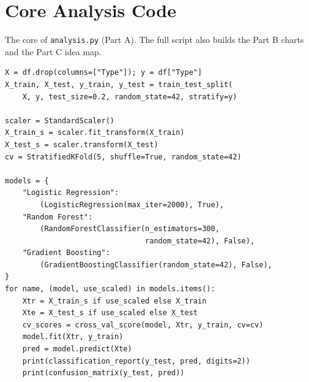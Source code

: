 \documentclass[conference]{IEEEtran}
\begin{document}
\appendix
\section{Core Analysis Code}
The core of \texttt{analysis.py} (Part A). The full script also builds the Part B charts and the Part C idea map.
\begin{verbatim}
X = df.drop(columns=["Type"]); y = df["Type"]
X_train, X_test, y_train, y_test = train_test_split(
    X, y, test_size=0.2, random_state=42, stratify=y)

scaler = StandardScaler()
X_train_s = scaler.fit_transform(X_train)
X_test_s = scaler.transform(X_test)
cv = StratifiedKFold(5, shuffle=True, random_state=42)

models = {
    "Logistic Regression":
        (LogisticRegression(max_iter=2000), True),
    "Random Forest":
        (RandomForestClassifier(n_estimators=300,
                                random_state=42), False),
    "Gradient Boosting":
        (GradientBoostingClassifier(random_state=42), False),
}
for name, (model, use_scaled) in models.items():
    Xtr = X_train_s if use_scaled else X_train
    Xte = X_test_s if use_scaled else X_test
    cv_scores = cross_val_score(model, Xtr, y_train, cv=cv)
    model.fit(Xtr, y_train)
    pred = model.predict(Xte)
    print(classification_report(y_test, pred, digits=2))
    print(confusion_matrix(y_test, pred))
\end{verbatim}
\end{document}

